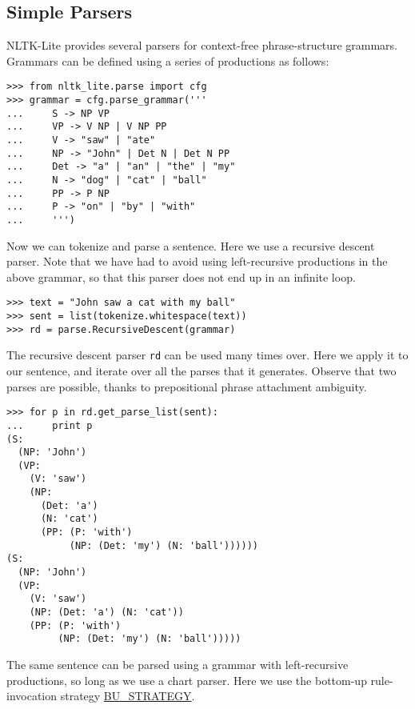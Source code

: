 \documentclass[11pt]{article}
\begin{document}
\subsection{Simple Parsers}

NLTK-Lite provides several parsers for context-free phrase-structure
grammars.  Grammars can be defined using a series of productions as follows:

{\small\begin{verbatim}
>>> from nltk_lite.parse import cfg
>>> grammar = cfg.parse_grammar('''
...     S -> NP VP
...     VP -> V NP | V NP PP
...     V -> "saw" | "ate"
...     NP -> "John" | Det N | Det N PP
...     Det -> "a" | "an" | "the" | "my"
...     N -> "dog" | "cat" | "ball"
...     PP -> P NP
...     P -> "on" | "by" | "with"
...     ''')
\end{verbatim}}

\noindent
Now we can tokenize and parse a sentence.  Here we use a recursive
descent parser.  Note that we have had to avoid using left-recursive
productions in the above grammar, so that this parser does not end up
in an infinite loop.

{\small\begin{verbatim}
>>> text = "John saw a cat with my ball"
>>> sent = list(tokenize.whitespace(text))
>>> rd = parse.RecursiveDescent(grammar)
\end{verbatim}}

The recursive descent parser \texttt{rd} can be used many times over.
Here we apply it to our sentence, and iterate over all the parses that
it generates.  Observe that two parses are possible, thanks to
prepositional phrase attachment ambiguity.

{\small\begin{verbatim}
>>> for p in rd.get_parse_list(sent):
...     print p
(S:
  (NP: 'John')
  (VP:
    (V: 'saw')
    (NP:
      (Det: 'a')
      (N: 'cat')
      (PP: (P: 'with')
           (NP: (Det: 'my') (N: 'ball'))))))
(S:
  (NP: 'John')
  (VP:
    (V: 'saw')
    (NP: (Det: 'a') (N: 'cat'))
    (PP: (P: 'with')
         (NP: (Det: 'my') (N: 'ball')))))
\end{verbatim}}

\noindent
The same sentence can be parsed using a grammar with left-recursive
productions, so long as we use a chart parser.  Here we use the
bottom-up rule-invocation strategy \url{BU_STRATEGY}.
\end{document}
